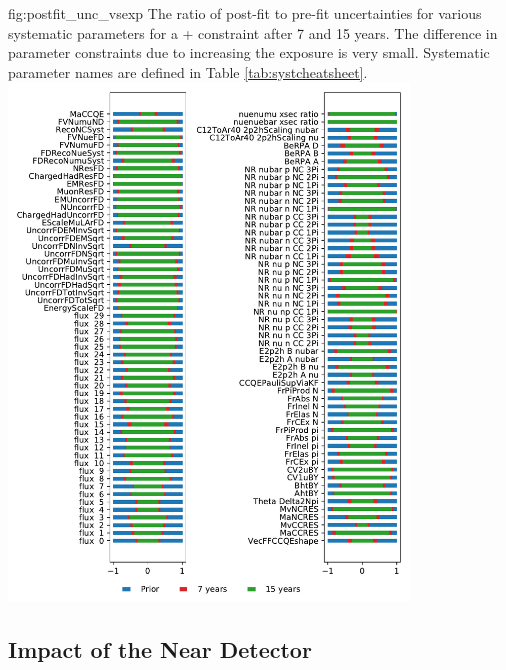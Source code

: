 \begin{dunefigure}{fig:postfit_unc_vsexp}
{The ratio of post-fit to pre-fit uncertainties for various systematic parameters for a + constraint after 7 and 15 years. The difference in parameter constraints due to increasing the exposure is very small. Systematic parameter names are defined in Table \ref{tab:systcheatsheet}.}
  \includegraphics[width=0.8\textwidth]{graphics/nuisancePostFits_NDFD_7vs15_th13_v4_1.pdf}
\end{dunefigure}




\subsection{Impact of the Near Detector}
\label{sec:ndimpact}

